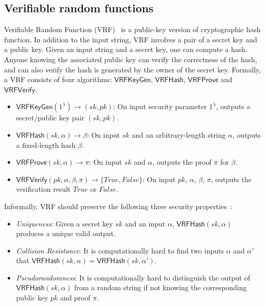 \subsection{Verifiable random functions}

Verifiable Random Function (VRF)~\cite{micali1999verifiable} is a public-key version of cryptographic hash function.
In addition to the input string, VRF involves a pair of a secret key and a public key.
Given an input string and a secret key, one can compute a hash.
Anyone knowing the associated public key can verify the correctness of the hash, and can also verify the hash is generated by the owner of the secret key.
Formally, a VRF consists of four algorithms: $\mathsf{VRFKeyGen}$, $\mathsf{VRFHash}$, $\mathsf{VRFProve}$ and $\mathsf{VRFVerify}$.

\begin{itemize}
    \item $\mathsf{VRFKeyGen}(1^{\lambda}) \to (sk, pk)$: On input security parameter $1^{\lambda}$, outputs a secret/public key pair $(sk, pk)$.
    \item $\mathsf{VRFHash}(sk, \alpha) \to \beta $: On input $sk$ and an arbitrary-length string $\alpha$, outputs a fixed-length hash $\beta$.
    \item $\mathsf{VRFProve}(sk, \alpha) \to \pi$: On input $sk$ and $\alpha$, outputs the proof $\pi$ for $\beta$.
    \item $\mathsf{VRFVerify}(pk, \alpha, \beta, \pi) \to \{True, False\}$: On input $pk$, $\alpha$, $\beta$, $\pi$, outputs the verification result $True$ or $False$.
\end{itemize}

Informally, VRF should preserve the following three security properties~\cite{goldberg2017draft}:

\begin{itemize}
    \item \emph{Uniqueness}: Given a secret key $sk$ and an input $\alpha$, $\mathsf{VRFHash}(sk, \alpha)$ produces a unique valid output.
    \item \emph{Collision Resistance}: It is computationally hard to find two inputs $\alpha$ and $\alpha'$ that $\mathsf{VRFHash}(sk, \alpha) = \mathsf{VRFHash}(sk, \alpha')$.
    \item \emph{Pseudorandomness}: It is computationally hard to distinguish the output of $\mathsf{VRFHash}(sk, \alpha)$ from a random string if not knowing the corresponding public key $pk$ and proof $\pi$.
\end{itemize}

